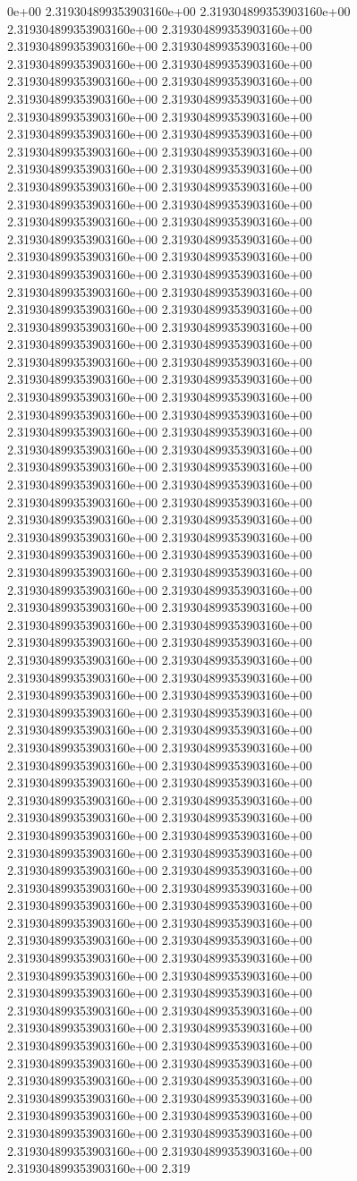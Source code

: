 0e+00	2.319304899353903160e+00	2.319304899353903160e+00	2.319304899353903160e+00	2.319304899353903160e+00	2.319304899353903160e+00	2.319304899353903160e+00	2.319304899353903160e+00	2.319304899353903160e+00	2.319304899353903160e+00	2.319304899353903160e+00	2.319304899353903160e+00	2.319304899353903160e+00	2.319304899353903160e+00	2.319304899353903160e+00	2.319304899353903160e+00	2.319304899353903160e+00	2.319304899353903160e+00	2.319304899353903160e+00	2.319304899353903160e+00	2.319304899353903160e+00	2.319304899353903160e+00	2.319304899353903160e+00	2.319304899353903160e+00	2.319304899353903160e+00	2.319304899353903160e+00	2.319304899353903160e+00	2.319304899353903160e+00	2.319304899353903160e+00	2.319304899353903160e+00	2.319304899353903160e+00	2.319304899353903160e+00	2.319304899353903160e+00	2.319304899353903160e+00	2.319304899353903160e+00	2.319304899353903160e+00	2.319304899353903160e+00	2.319304899353903160e+00	2.319304899353903160e+00	2.319304899353903160e+00	2.319304899353903160e+00	2.319304899353903160e+00	2.319304899353903160e+00	2.319304899353903160e+00	2.319304899353903160e+00	2.319304899353903160e+00	2.319304899353903160e+00	2.319304899353903160e+00	2.319304899353903160e+00	2.319304899353903160e+00	2.319304899353903160e+00	2.319304899353903160e+00	2.319304899353903160e+00	2.319304899353903160e+00	2.319304899353903160e+00	2.319304899353903160e+00	2.319304899353903160e+00	2.319304899353903160e+00	2.319304899353903160e+00	2.319304899353903160e+00	2.319304899353903160e+00	2.319304899353903160e+00	2.319304899353903160e+00	2.319304899353903160e+00	2.319304899353903160e+00	2.319304899353903160e+00	2.319304899353903160e+00	2.319304899353903160e+00	2.319304899353903160e+00	2.319304899353903160e+00	2.319304899353903160e+00	2.319304899353903160e+00	2.319304899353903160e+00	2.319304899353903160e+00	2.319304899353903160e+00	2.319304899353903160e+00	2.319304899353903160e+00	2.319304899353903160e+00	2.319304899353903160e+00	2.319304899353903160e+00	2.319304899353903160e+00	2.319304899353903160e+00	2.319304899353903160e+00	2.319304899353903160e+00	2.319304899353903160e+00	2.319304899353903160e+00	2.319304899353903160e+00	2.319304899353903160e+00	2.319304899353903160e+00	2.319304899353903160e+00	2.319304899353903160e+00	2.319304899353903160e+00	2.319304899353903160e+00	2.319304899353903160e+00	2.319304899353903160e+00	2.319304899353903160e+00	2.319304899353903160e+00	2.319304899353903160e+00	2.319304899353903160e+00	2.319304899353903160e+00	2.319304899353903160e+00	2.319304899353903160e+00	2.319304899353903160e+00	2.319304899353903160e+00	2.319304899353903160e+00	2.319304899353903160e+00	2.319304899353903160e+00	2.319304899353903160e+00	2.319304899353903160e+00	2.319304899353903160e+00	2.319304899353903160e+00	2.319304899353903160e+00	2.319304899353903160e+00	2.319304899353903160e+00	2.319304899353903160e+00	2.319304899353903160e+00	2.319304899353903160e+00	2.319304899353903160e+00	2.319304899353903160e+00	2.319304899353903160e+00	2.319304899353903160e+00	2.319304899353903160e+00	2.319304899353903160e+00	2.319304899353903160e+00	2.319304899353903160e+00	2.319304899353903160e+00	2.319304899353903160e+00	2.319304899353903160e+00	2.319304899353903160e+00	2.319304899353903160e+00	2.319304899353903160e+00	2.319304899353903160e+00	2.319304899353903160e+00	2.319304899353903160e+00	2.319